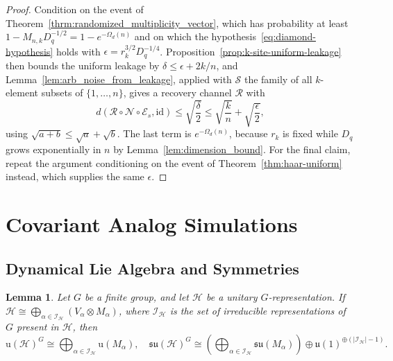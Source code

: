 \documentclass[11pt,letterpaper]{article}
\theoremstyle{plain}
\theoremstyle{plain}
\theoremstyle{plain}
\theoremstyle{plain}
\theoremstyle{plain}
\theoremstyle{plain}
\theoremstyle{plain}
\newtheorem{smlemma}[smtheorem]{Lemma}
\theoremstyle{definition}
\theoremstyle{plain}
\begin{document}
\begin{proof}
    Condition on the event of Theorem~\ref{thrm:randomized_multiplicity_vector}, which has probability at least $1-M_{n,k}D_q^{-1/2}=1-e^{-\Omega_d(n)}$ and on which the hypothesis~\eqref{eq:diamond-hypothesis} holds with $\epsilon=r_k^{3/2}D_q^{-1/4}$. 
    Proposition~\ref{prop:k-site-uniform-leakage} then bounds the uniform leakage by $\delta\le\epsilon+2k/n$, and Lemma~\ref{lem:arb_noise_from_leakage}, applied with $\mathcal S$ the family of all $k$-element subsets of $\{1,\ldots,n\}$, gives a recovery channel $\mathcal R$ with
    \[
        d(\mathcal R\circ\mathcal N\circ\mathcal E_s,\mathrm{id})
        \le
        \sqrt{\frac\delta2}
        \le
        \sqrt{\frac kn}
        +
        \sqrt{\frac\epsilon2},
    \]
    using $\sqrt{a+b}\le\sqrt a+\sqrt b$.  The last term is $e^{-\Omega_d(n)}$, because $r_k$ is fixed while $D_q$ grows exponentially in $n$ by Lemma~\ref{lem:dimension_bound}. 
    For the final claim, repeat the argument conditioning on the event of Theorem~\ref{thm:haar-uniform} instead, which supplies the same $\epsilon$.
\end{proof}

\section{Covariant Analog Simulations}\label{sec:supple_analog_sim}

\subsection{Dynamical Lie Algebra and Symmetries}\label{subsec:supple_finite_group_symmetry_DLA}

\begin{smlemma}\label{lem:reductive_decomposition}
    Let $G$ be a finite group, and let $\mathcal{H}$ be a unitary $G$-representation. If $\mathcal{H} \cong \bigoplus_{\alpha\in \mathcal{I}_{\mathcal{H}}}\left(V_\alpha \otimes M_{\alpha}\right)$, where $\mathcal{I}_{\mathcal{H}}$ 
    is the set of irreducible representations of $G$ present in $\mathcal{H}$, then
    $$
    \mathrm{u}(\mathcal{H})^G \cong \bigoplus_{\alpha\in \mathcal{I}_{\mathcal{H}}} \mathrm{u}\left(M_{\alpha}\right),\quad \mathfrak{s} \mathfrak{u}(\mathcal{H})^G \cong\left(\bigoplus_{\alpha\in \mathcal{I}_{\mathcal{H}}} \mathfrak{s} \mathfrak{u}\left(M_{\alpha}\right)\right) \oplus \mathfrak{u}(1)^{\oplus(|\mathcal{I}_{\mathcal{H}}|-1)} .
    $$
\end{smlemma}
\end{document}
